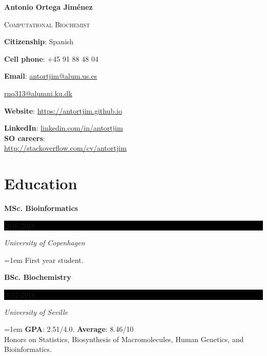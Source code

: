 \documentclass[paper=a4,fontsize=11pt]{article} %
\newcommand{\sepspace}{\vspace*{1em}}		%
\newcommand{\MyName}[1]{ %
		\Huge \usefont{OT1}{phv}{b}{n} \hfill #1
		\par \normalsize \normalfont}
\newcommand{\MySlogan}[1]{ %
		\large \usefont{OT1}{phv}{m}{n}\hfill \textit{#1}
		\par \normalsize \normalfont}
\newcommand{\NewPart}[1]{\section*{
									{#1}}}
\newcommand{\EducationEntry}[4]{
		\noindent \textbf{#1} \hfill      %
		\colorbox{Black}{%
			\parbox{6em}{%
			\hfill\color{White}#2}} \par  %
		\noindent \textit{#3} \par        %
		\noindent\hangindent=1em\hangafter=0 \small #4 %
		\normalsize \par}
\begin{document}

%

\thispagestyle{plain}
\def\name{\textcolor{StrongRed}{Antonio Ortega Jim\'enez}}

\centerline{\LARGE\bf \name}
\vspace{0.1in}
\centerline{\textcolor{awesome-red}{\textsc{Computational Biochemist}}}
\vspace{0.25in}



\begin{minipage}[t]{0.65\textwidth}
  \textbf{Citizenship}: Spanish \par
  \textbf{Cell phone}: +45 91 88 48 04 \par
  \textbf{Email}: \href{mailto:antortjim@alum.us.es}{antortjim@alum.us.es} \par
  \leftskip=1.1cm  \href{mailto:rnq313@alumni.ku.dk}{rnq313@alumni.ku.dk} \par
  \leftskip=0cm \textbf{Website}: \href{https://antortjim.github.io}{https://antortjim.github.io} \par
  
\end{minipage}
\begin{minipage}[t]{0.35\textwidth}
  \textbf{LinkedIn}: \href{http://www.linkedin.com/in/antortjim}{linkedin.com/in/antortjim} \\
   \textbf{SO careers}:\\
   \href{http://stackoverflow.com/cv/antortjim}{http://stackoverflow.com/cv/antortjim} \\

\end{minipage}



\NewPart{Education}{}

\EducationEntry{MSc. Bioinformatics}{2016-2018}{University of Copenhagen}{First year student.}
\sepspace

\EducationEntry{BSc. Biochemistry}{2012-2016}{University of Seville}{\textbf{GPA}: 2.51/4.0. \textbf{Average}: 8.46/10 \\
  Honors on Statistics, Biosynthesis of Macromolecules, Human Genetics, and Bioinformatics.}
\sepspace
 
\end{document}
